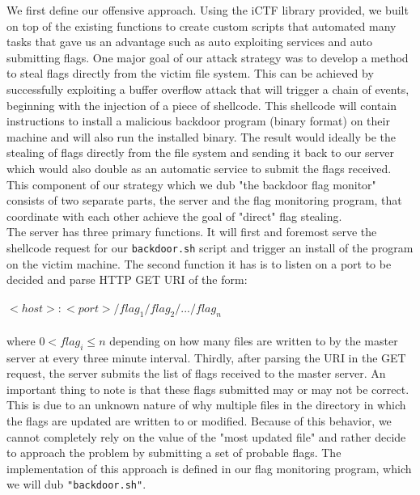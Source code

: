 \documentclass[12pt]{report}
\begin{document}
\noindent We first define our offensive approach. Using the iCTF library provided, we built on top of the existing functions to create custom scripts that automated many tasks that gave us an advantage such as auto exploiting services and auto submitting flags. One major goal of our attack strategy was to develop a method to steal flags directly from the victim file system. This can be achieved by successfully exploiting a buffer overflow attack that will trigger a chain of events, beginning with the injection of a piece of shellcode. This shellcode will contain instructions to install a malicious backdoor program (binary format) on their machine and will also run the installed binary. The result would ideally be the stealing of flags directly from the file system and sending it back to our server which would also double as an automatic service to submit the flags received. This component of our strategy which we dub "the backdoor flag monitor" consists of two separate parts, the server and the flag monitoring program, that coordinate with each other achieve the goal of "direct" flag stealing. \\

\noindent The server has three primary functions. It will first and foremost serve the shellcode request for our \texttt{backdoor.sh} script and trigger an install of the program on the victim machine. The second function it has is to listen on a port to be decided and parse HTTP GET URI of the form:\\\\
$<host>:<port>/flag_{1}/flag_{2}/.../flag_{n}$\\\\ where $0 < flag_i \leq n$ depending on how many files are written to by the master server at every three minute interval. Thirdly, after parsing the URI in the GET request, the server submits the list of flags received to the master server. An important thing to note is that these flags submitted may or may not be correct. This is due to an unknown nature of why multiple files in the directory in which the flags are updated are written to or modified. Because of this behavior, we cannot completely rely on the value of the "most updated file" and rather decide to approach the problem by submitting a set of probable flags. The implementation of this approach is defined in our flag monitoring program, which we will dub \texttt{"backdoor.sh"}.\\
\end{document}
